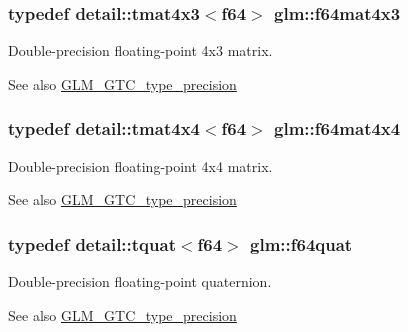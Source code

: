 \subsubsection[{f64mat4x3}]{\setlength{\rightskip}{0pt plus 5cm}typedef detail\+::tmat4x3$<$f64$>$ {\bf glm\+::f64mat4x3}}\label{group__gtc__type__precision_gaa24e152ef6e17be752c350e495c879de}
Double-\/precision floating-\/point 4x3 matrix. \begin{DoxySeeAlso}{See also}
\hyperlink{group__gtc__type__precision}{G\+L\+M\+\_\+\+G\+T\+C\+\_\+type\+\_\+precision} 
\end{DoxySeeAlso}
\hypertarget{group__gtc__type__precision_ga8f54fb7f48ddf13b3dea075ae89baa78}{}
\subsubsection[{f64mat4x4}]{\setlength{\rightskip}{0pt plus 5cm}typedef detail\+::tmat4x4$<$f64$>$ {\bf glm\+::f64mat4x4}}\label{group__gtc__type__precision_ga8f54fb7f48ddf13b3dea075ae89baa78}
Double-\/precision floating-\/point 4x4 matrix. \begin{DoxySeeAlso}{See also}
\hyperlink{group__gtc__type__precision}{G\+L\+M\+\_\+\+G\+T\+C\+\_\+type\+\_\+precision} 
\end{DoxySeeAlso}
\hypertarget{group__gtc__type__precision_ga61f850d473c8569fcc124bdeed386f57}{}
\subsubsection[{f64quat}]{\setlength{\rightskip}{0pt plus 5cm}typedef detail\+::tquat$<$f64$>$ {\bf glm\+::f64quat}}\label{group__gtc__type__precision_ga61f850d473c8569fcc124bdeed386f57}
Double-\/precision floating-\/point quaternion. \begin{DoxySeeAlso}{See also}
\hyperlink{group__gtc__type__precision}{G\+L\+M\+\_\+\+G\+T\+C\+\_\+type\+\_\+precision} 
\end{DoxySeeAlso}
\hypertarget{group__gtc__type__precision_ga9dabdd8a91258b035759121fa7880cb6}{}
